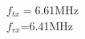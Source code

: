 \documentclass[preview]{standalone}
\begin{document}
\begin{center}
$f_{tx}=$6.61MHz\\$f_{rx}$=6.41MHz
\end{center}
\end{document}
